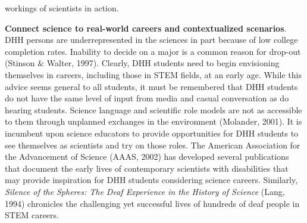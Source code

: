 \documentclass[11.5pt]{sig-alternate} %
\begin{document}
\begin{large}
workings of scientists in action. 

\textbf{Connect science to real-world careers and contextualized scenarios}. DHH persons are underrepresented in the sciences in part because of low college completion rates.  Inability to decide on a major is a common reason for drop-out (Stinson \& Walter, 1997).  Clearly, DHH students need to begin envisioning themselves in careers, including those in STEM fields, at an early age.  While this advice seems general to all students, it must be remembered that DHH students do not have the same level of input from media and casual conversation as do hearing students.  Science language and scientific role models are not as accessible to them through unplanned exchanges in the environment (Molander, 2001).  It is incumbent upon science educators to provide opportunities for DHH students to see themselves as scientists and try on those roles.  The American Association for the Advancement of Science (AAAS, 2002) has developed several publications that document the early lives of contemporary scientists with disabilities that may provide inspiration for DHH students considering science careers.  Similarly, \textit{Silence of the Spheres: The Deaf Experience in the History of Science} (Lang, 1994) chronicles the challenging yet successful lives of hundreds of deaf people in STEM careers.


\end{large}
\end{document}
